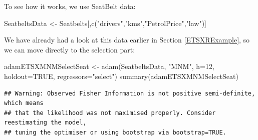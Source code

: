 \documentclass[
]{book}
\newenvironment{Shaded}{\begin{snugshade}}{\end{snugshade}}
\newcommand{\AttributeTok}[1]{\textcolor[rgb]{0.77,0.63,0.00}{#1}}
\newcommand{\ConstantTok}[1]{\textcolor[rgb]{0.00,0.00,0.00}{#1}}
\newcommand{\DecValTok}[1]{\textcolor[rgb]{0.00,0.00,0.81}{#1}}
\newcommand{\FunctionTok}[1]{\textcolor[rgb]{0.00,0.00,0.00}{#1}}
\newcommand{\NormalTok}[1]{#1}
\newcommand{\OtherTok}[1]{\textcolor[rgb]{0.56,0.35,0.01}{#1}}
\newcommand{\StringTok}[1]{\textcolor[rgb]{0.31,0.60,0.02}{#1}}
\theoremstyle{definition}
\theoremstyle{definition}
\theoremstyle{definition}
\theoremstyle{definition}
\theoremstyle{remark}
\begin{document}
To see how it works, we use SeatBelt data:

\begin{Shaded}
\begin{Highlighting}[]
\NormalTok{SeatbeltsData }\OtherTok{\textless{}{-}}\NormalTok{ Seatbelts[,}\FunctionTok{c}\NormalTok{(}\StringTok{"drivers"}\NormalTok{,}\StringTok{"kms"}\NormalTok{,}\StringTok{"PetrolPrice"}\NormalTok{,}\StringTok{"law"}\NormalTok{)]}
\end{Highlighting}
\end{Shaded}

We have already had a look at this data earlier in Section \ref{ETSXRExample}, so we can move directly to the selection part:

\begin{Shaded}
\begin{Highlighting}[]
\NormalTok{adamETSXMNMSelectSeat }\OtherTok{\textless{}{-}} \FunctionTok{adam}\NormalTok{(SeatbeltsData, }\StringTok{"MNM"}\NormalTok{,}
                               \AttributeTok{h=}\DecValTok{12}\NormalTok{, }\AttributeTok{holdout=}\ConstantTok{TRUE}\NormalTok{,}
                               \AttributeTok{regressors=}\StringTok{"select"}\NormalTok{)}
\FunctionTok{summary}\NormalTok{(adamETSXMNMSelectSeat)}
\end{Highlighting}
\end{Shaded}

\begin{verbatim}
## Warning: Observed Fisher Information is not positive semi-definite, which means
## that the likelihood was not maximised properly. Consider reestimating the model,
## tuning the optimiser or using bootstrap via bootstrap=TRUE.
\end{verbatim}
\end{document}
